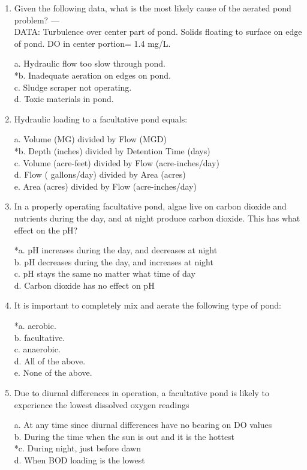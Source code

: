 \begin{enumerate}
\item  Given the following data, what is the most likely cause of the aerated pond problem? ---\\
DATA: Turbulence over center part of pond. Solids floating to surface on edge of pond. DO in center portion= 1.4 mg/L. 

a. Hydraulic flow too slow through pond. \\
*b. Inadequate aeration on edges on pond. \\
c. Sludge scraper not operating. \\
d. Toxic materials in pond. 


\item  Hydraulic loading to a facultative pond equals: 

a. Volume (MG) divided by Flow (MGD) \\
*b. Depth (inches) divided by Detention Time (days) \\
c. Volume (acre-feet) divided by Flow (acre-inches/day) \\
d. Flow ( gallons/day) divided by Area (acres) \\
e. Area (acres) divided by Flow (acre-inches/day) 


\item  In a properly operating facultative pond, algae live on carbon dioxide and nutrients during the day, and at night produce carbon dioxide. This has what effect on the pH? 

*a. pH increases during the day, and decreases at night \\
b. pH decreases during the day, and increases at night \\
c. pH stays the same no matter what time of day \\
d. Carbon dioxide has no effect on pH 


\item  It is important to completely mix and aerate the following type of pond: 

*a. aerobic. \\
b. facultative. \\
c. anaerobic. \\
d. All of the above. \\
e. None of the above. 


\item  Due to diurnal differences in operation, a facultative pond is likely to experience the lowest dissolved oxygen readings 

a. At any time since diurnal differences have no bearing on DO values \\
b. During the time when the sun is out and it is the hottest \\
*c. During night, just before dawn \\
d. When BOD loading is the lowest 



\end{enumerate}
